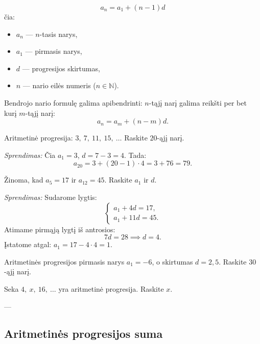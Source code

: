 \begin{tcolorbox}[colback=green!5!white, colframe=green!60!black, title={Bendrojo nario formulė}]
\[
\boxed{a_n = a_1 + (n-1)d}
\]
čia:
\begin{itemize}
    \item $a_n$ — $n$-tasis narys,
    \item $a_1$ — pirmasis narys,
    \item $d$ — progresijos skirtumas,
    \item $n$ — nario eilės numeris ($n \in \mathbb{N}$).
\end{itemize}
\end{tcolorbox}

\begin{remark}
Bendrojo nario formulę galima apibendrinti: $n$-tąjį narį galima reikšti per bet kurį $m$-tąjį narį:
\[
a_n = a_m + (n - m)d.
\]
\end{remark}

\begin{example}
Aritmetinė progresija: $3,\ 7,\ 11,\ 15,\ \ldots$ Raskite $20$-ąjį narį.

\textit{Sprendimas:} Čia $a_1 = 3$, $d = 7 - 3 = 4$. Tada:
\[
a_{20} = 3 + (20 - 1) \cdot 4 = 3 + 76 = 79.
\]
\end{example}

\begin{example}
Žinoma, kad $a_5 = 17$ ir $a_{12} = 45$. Raskite $a_1$ ir $d$.

\textit{Sprendimas:} Sudarome lygtis:
\[
\begin{cases}
a_1 + 4d = 17,\\
a_1 + 11d = 45.
\end{cases}
\]
Atimame pirmąją lygtį iš antrosios:
\[
7d = 28 \implies d = 4.
\]
Įstatome atgal: $a_1 = 17 - 4 \cdot 4 = 1$.
\end{example}

\begin{exercise}
Aritmetinės progresijos pirmasis narys $a_1 = -6$, o skirtumas $d = 2{,}5$. Raskite $30$-ąjį narį.
\end{exercise}

\begin{exercise}
Seka $4,\ x,\ 16,\ \ldots$ yra aritmetinė progresija. Raskite $x$.
\end{exercise}

---

\subsection{Aritmetinės progresijos suma}

